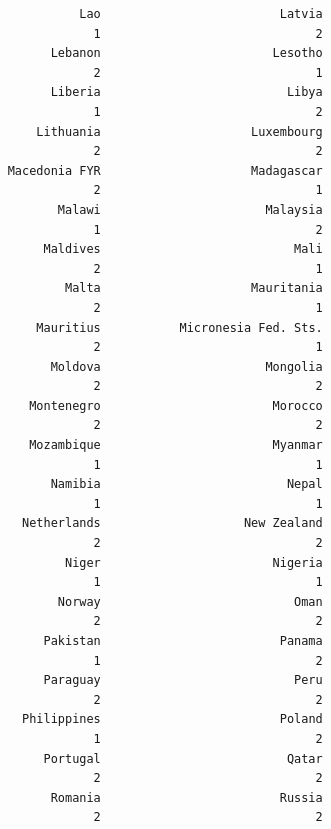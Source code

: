 \documentclass[
]{article}
\begin{document}
\begin{verbatim}
                           Lao                         Latvia 
                             1                              2 
                       Lebanon                        Lesotho 
                             2                              1 
                       Liberia                          Libya 
                             1                              2 
                     Lithuania                     Luxembourg 
                             2                              2 
                 Macedonia FYR                     Madagascar 
                             2                              1 
                        Malawi                       Malaysia 
                             1                              2 
                      Maldives                           Mali 
                             2                              1 
                         Malta                     Mauritania 
                             2                              1 
                     Mauritius           Micronesia Fed. Sts. 
                             2                              1 
                       Moldova                       Mongolia 
                             2                              2 
                    Montenegro                        Morocco 
                             2                              2 
                    Mozambique                        Myanmar 
                             1                              1 
                       Namibia                          Nepal 
                             1                              1 
                   Netherlands                    New Zealand 
                             2                              2 
                         Niger                        Nigeria 
                             1                              1 
                        Norway                           Oman 
                             2                              2 
                      Pakistan                         Panama 
                             1                              2 
                      Paraguay                           Peru 
                             2                              2 
                   Philippines                         Poland 
                             1                              2 
                      Portugal                          Qatar 
                             2                              2 
                       Romania                         Russia 
                             2                              2 

\end{verbatim}
\end{document}
